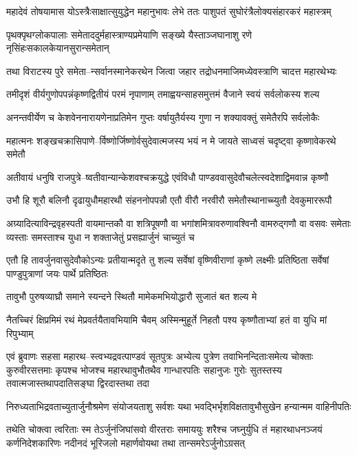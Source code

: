 \twolineshloka
{महादेवं तोषयामास योऽस्त्रैःसाक्षात्सुयुद्धेन महानुभावः}
{लेभे ततः पाशुपतं सुघोरंत्रैलोक्यसंहारकरं महास्त्रम्}


\twolineshloka
{पृथक्पृथग्लोकपालाः समेताददुर्महास्त्राण्यप्रमेयाणि सङ्ख्ये}
{यैस्ताञ्जघानाशु रणे नृसिंहःसकालकेयानसुरान्समेतान्}


\twolineshloka
{तथा विराटस्य पुरे समेता--न्सर्वानस्मानेकरथेन जित्वा}
{जहार तद्रोधनमाजिमध्येवस्त्राणि चादत्त महारथेभ्यः}


\twolineshloka
{तमीदृशं वीर्यगुणोपपन्नंकृष्णद्वितीयं परमं नृपाणाम्}
{तमाह्वयन्साहसमुत्तमं वैजाने स्वयं सर्वलोकस्य शल्य}


\twolineshloka
{अनन्तवीर्येण च केशवेननारायणेनाप्रतिमेन गुप्तः}
{वर्षायुतैर्यस्य गुणा न शक्यावक्तुं समेतैरपि सर्वलोकैः}


\twolineshloka
{महात्मनः शङ्खचक्रासिपाणे--र्विष्णोर्जिष्णोर्वसुदेवात्मजस्य}
{भयं न मे जायते साध्वसं चदृष्ट्वा कृष्णावेकरथे समेतौ}


\twolineshloka
{अतीवायं धनुषि राजपुत्रे--ष्वतीवान्यान्केशवश्चक्रयुद्धे}
{एवंविधौ पाण्डववासुदेवौचलेत्स्वदेशाद्विमवान्न कृष्णौ}


\twolineshloka
{उभौ हि शूरौ बलिनौ दृढायुधौमहारथौ संहननोपपन्नौ}
{एतौ वीरौ नरवीरौ समेतौस्थानाच्च्युतौ देवकुमाररूपौ}


\threelineshloka
{अग्र्यादित्याविन्द्रवृहस्पती वायमान्तकौ वा शत्रिपूषणौ वा}
{भगांशमित्रावरुणावश्विनौ वामरुद्गणौ वा वसवः समेताः}
{व्यस्ताः समस्ताश्च युधा न शक्ताजेतुं प्रसह्यार्जुनं चाच्युतं च}


एतौ हि तावर्जुनवासुदेवौकोऽन्यः प्रतीयान्मदृते तु शल्य
\twolineshloka
{सर्वेषां वृष्णिवीराणां कृष्णे लक्ष्मीः प्रतिष्ठिता}
{सर्वेषां पाण्डुपुत्राणां जयः पार्थे प्रतिष्ठितः}


\twolineshloka
{तावुभौ पुरुषव्याघ्रौ समाने स्यन्दने स्थितौ}
{मामेकमभियोद्धारौ सुजातं बत शल्य मे}


\twolineshloka
{नैतच्चिरं क्षिप्रमिमं रथं मेप्रवर्तयैतावभियामि चैवम्}
{अस्मिन्मुहूर्ते निहतौ पश्य कृष्णौताभ्यां हतं वा युधि मां रिपुभ्याम्}


एवं ब्रुवाणः सहसा महारथ--स्त्वभ्यद्रवत्पाण्डवं सूतपुत्रः
\threelineshloka
{अभ्येत्य पुत्रेण तवाभिनन्दिताःसमेत्य चोक्ताः कुरुवीरसत्तमाः}
{कृपश्च भोजश्च महारथावुभौतथैव गान्धारपतिः सहानुजः}
{गुरोः सुतस्तस्य तवात्मजास्तथापदातिसङ्घा द्विरदास्तथा तदा}


\twolineshloka
{निरुध्यताभिद्रवताच्युतार्जुनौश्रमेण संयोजयताशु सर्वशः}
{यथा भवद्भिर्भृशविक्षतावुभौसुखेन हन्यान्मम वाहिनीपतिः}


\threelineshloka
{तथेति चोक्त्वा त्वरिताः स्म तेऽर्जुनंजिघांसवो वीरतराः समाययुः}
{शरैश्च जघ्नुर्युधि तं महारथाधनञ्जयं कर्णनिदेशकारिणः}
{नदीनदं भूरिजलो महार्णवोयथा तथा तान्समरेऽर्जुनोऽग्रसत्}


